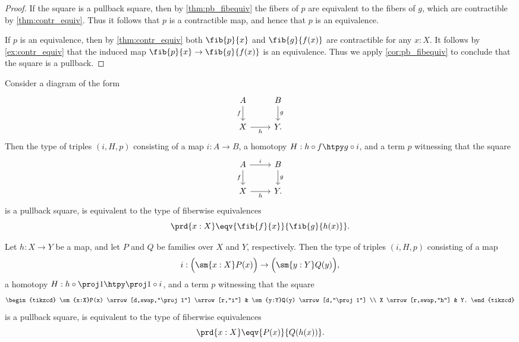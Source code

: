 \begin{proof}
If the square is a pullback square, then by \cref{thm:pb_fibequiv} the fibers of $p$ are equivalent to the fibers of $g$, which are contractible by \cref{thm:contr_equiv}. Thus it follows that $p$ is a contractible map, and hence that $p$ is an equivalence.

If $p$ is an equivalence, then by \cref{thm:contr_equiv} both $\fib{p}{x}$ and $\fib{g}{f(x)}$ are contractible for any $x:X$. It follows by \cref{ex:contr_equiv} that the induced map $\fib{p}{x}\to\fib{g}{f(x)}$ is an equivalence. Thus we apply \cref{cor:pb_fibequiv} to conclude that the square is a pullback.
\end{proof}

\begin{thm}\label{thm:pb_fibequiv_complete}
Consider a diagram of the form
\begin{equation*}
\begin{tikzcd}
A \arrow[d,swap,"f"] & B \arrow[d,"g"] \\
X \arrow[r,swap,"h"] & Y.
\end{tikzcd}
\end{equation*}
Then the type of triples $(i,H,p)$ consisting of a map $i:A\to B$, a homotopy $H:h\circ f\htpy g\circ i$, and a term $p$ witnessing that the square
\begin{equation*}
\begin{tikzcd}
A \arrow[d,swap,"f"] \arrow[r,"i"] & B \arrow[d,"g"] \\
X \arrow[r,swap,"h"] & Y.
\end{tikzcd}
\end{equation*}
is a pullback square, is equivalent to the type of fiberwise equivalences
\begin{equation*}
\prd{x:X}\eqv{\fib{f}{x}}{\fib{g}{h(x)}}.
\end{equation*}
\end{thm}

\begin{cor}\label{cor:pb_fibequiv_complete}
Let $h:X\to Y$ be a map, and let $P$ and $Q$ be families over $X$ and $Y$, respectively.
Then the type of triples $(i,H,p)$ consisting of a map 
\begin{equation*}
i:\Big(\sm{x:X}P(x)\Big)\to \Big(\sm{y:Y}Q(y)\Big),
\end{equation*}
a homotopy $H:h\circ \proj 1\htpy \proj 1\circ i$, and a term $p$ witnessing that the square
\begin{equation*}
\begin{tikzcd}
\sm{x:X}P(x) \arrow[d,swap,"\proj 1"] \arrow[r,"i"] & \sm{y:Y}Q(y) \arrow[d,"\proj 1"] \\
X \arrow[r,swap,"h"] & Y.
\end{tikzcd}
\end{equation*}
is a pullback square, is equivalent to the type of fiberwise equivalences
\begin{equation*}
\prd{x:X}\eqv{P(x)}{Q(h(x))}.
\end{equation*}
\end{cor}

